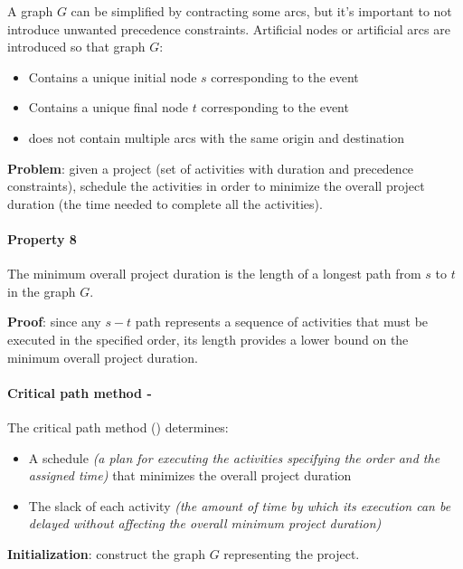 \documentclass[english]{article}
\begin{document}
A graph \(G\) can be simplified by contracting some arcs, but it's important to not introduce unwanted precedence constraints.
Artificial nodes or artificial arcs are introduced so that graph \(G\):

\begin{itemize}
  \item Contains a unique initial node \(s\) corresponding to the event 
  \item Contains a unique final node \(t\) corresponding to the event 
  \item does not contain multiple arcs with the same origin and destination
\end{itemize}

\bigskip
\textbf{Problem}:
given a project (set of activities with duration and precedence constraints), schedule the activities in order to minimize the overall project duration (the time needed to complete all the activities).

\paragraph{Property 8}

The minimum overall project duration is the length of a longest path from \(s\) to \(t\) in the graph \(G\).

\textbf{Proof}:
since any \(s-t\) path represents a sequence of activities that must be executed in the specified order, its length provides a lower bound on the minimum overall project duration.

\paragraph{Critical path method - \CPM}

The critical path method (\CPM) determines:

\begin{itemize}
  \item A schedule \textit{(a plan for executing the activities specifying the order and the assigned time)} that minimizes the overall project duration
  \item The slack of each activity \textit{(the amount of time by which its execution can be delayed without affecting the overall minimum project duration)}
\end{itemize}

\bigskip
\textbf{Initialization}:
construct the graph \(G\) representing the project.
\end{document}

